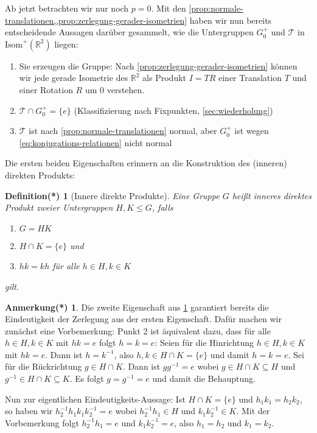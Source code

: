 \documentclass[a4paper, ngerman]{article}
\newcounter{chapter}
\numberwithin{equation}{chapter}
\theoremstyle{plain}
\newtheorem{definitionstrd}{Definition(*)}[chapter]
\theoremstyle{definition}
\newtheorem{annotationstrd}{Anmerkung(*)}[chapter]
\newcommand{\geradisometr}{\ensuremath{\mathrm{Isom}^+(\mathbb R^2)}}
\newcommand{\anm}[1]{{\color{red} #1}}
\begin{document}
Ab jetzt betrachten wir nur noch \(p=0\). Mit den \cref{prop:normale-translationen,,prop:zerlegung-gerader-isometrien} haben wir nun bereits entscheidende Aussagen darüber gesammelt, wie die Untergruppen \(G_0^+\) und \(\mathcal T\) in \(\geradisometr\) liegen: 
\begin{enumerate}
    \item Sie erzeugen die Gruppe: Nach \cref{prop:zerlegung-gerader-isometrien} können wir jede gerade Isometrie des \(\mathbb R^2\) als Produkt \(I=TR\) einer Translation \(T\) und einer Rotation \(R\) um \(0\) verstehen. 
    \item \(\mathcal T \cap G_0^+ = \{e\}\) (Klassifizierung nach Fixpunkten, \cref{sec:wiederholung}) %
    \item \(\mathcal T\) ist nach \cref{prop:normale-translationen} normal, aber \(G_0^+\) ist wegen \eqref{eq:konjugations-relationen} nicht normal %
\end{enumerate}
Die ersten beiden Eigenschaften erinnern an die Konstruktion des (inneren) direkten Produkts: 
\begin{definitionstrd}[Innere direkte Produkte]\label{def*:innere-direkte-produkte}
    Eine Gruppe \(G\) heißt \emph{inneres direktes Produkt} zweier Untergruppen \(H,K \leq G\), falls 
    \begin{enumerate}
        \item \(G = HK\)
        \item \(H \cap K = \{e\}\) und 
        \item \(hk = kh\) für alle \(h\in H, k \in K\)
    \end{enumerate}
    gilt. 
\end{definitionstrd}
\begin{annotationstrd}\label{ann*:eindeutige-zerlegung-innere-direkte-produkte}
    Die zweite Eigenschaft aus \cref{def*:innere-direkte-produkte} garantiert bereits die Eindeutigkeit der Zerlegung aus der ersten Eigenschaft. Dafür machen wir zunächst eine Vorbemerkung: Punkt 2 ist äquivalent dazu, dass für alle \(h\in H, k \in K\) mit \(hk = e\) folgt \(h = k = e\): Seien für die Hinrichtung \(h \in H, k \in K\) mit \(hk = e\). Dann ist \(h = k^{-1}\), also \(h, k \in H\cap K = \{e\}\) und damit \(h = k = e\).  Sei für die Rückrichtung \(g \in H\cap K\). Dann ist \(g g^{-1} = e\) wobei \(g \in H\cap K \subseteq H\) und \(g^{-1} \in H\cap K \subseteq K\). Es folgt \(g = g^{-1} = e\) und damit die Behauptung. 
    
    Nun zur eigentlichen Eindeutigkeits-Aussage: Ist \(H \cap K = \{e\}\) und \(h_1 k_1 = h_2 k_2\), so haben wir \(h_2^{-1} h_1 k_1 k_2^{-1} = e\) wobei \(h_2^{-1}h_1 \in H\) und \(k_1 k_2^{-1}\in K\). Mit der Vorbemerkung folgt \(h_2^{-1}h_1 = e\) und \(k_1 k_2^{-1} = e\), also \(h_1 = h_2\) und \(k_1 = k_2\). 
\end{annotationstrd}
\end{document}
